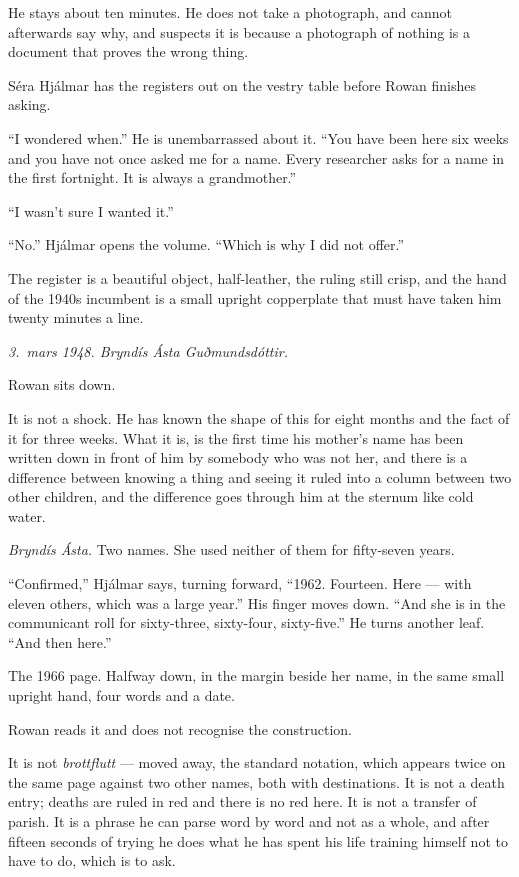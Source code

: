 \documentclass[11pt,oneside]{book}
\newcommand{\sceneline}{%
  \par\vspace{1.2em}
  \begin{center}
    \fontsize{11}{11}\selectfont \textbullet\quad\textbullet\quad\textbullet
  \end{center}
  \vspace{0.6em}\noindent\ignorespaces
}
\begin{document}
He stays about ten minutes. He does not take a photograph, and cannot
afterwards say why, and suspects it is because a photograph of nothing
is a document that proves the wrong thing.

\sceneline

Séra Hjálmar has the registers out on the vestry table before Rowan
finishes asking.

``I wondered when.'' He is unembarrassed about it. ``You have been here
six weeks and you have not once asked me for a name. Every researcher
asks for a name in the first fortnight. It is always a grandmother.''

``I wasn't sure I wanted it.''

``No.'' Hjálmar opens the volume. ``Which is why I did not offer.''

The register is a beautiful object, half-leather, the ruling still crisp,
and the hand of the 1940s incumbent is a small upright copperplate that
must have taken him twenty minutes a line.

\emph{3.~mars 1948. Bryndís Ásta Guðmundsdóttir.}

Rowan sits down.

It is not a shock. He has known the shape of this for eight months and
the fact of it for three weeks. What it is, is the first time his
mother's name has been written down in front of him by somebody who was
not her, and there is a difference between knowing a thing and seeing it
ruled into a column between two other children, and the difference goes
through him at the sternum like cold water.

\emph{Bryndís Ásta.} Two names. She used neither of them for fifty-seven
years.

``Confirmed,'' Hjálmar says, turning forward, ``1962. Fourteen. Here
--- with eleven others, which was a large year.'' His finger moves down.
``And she is in the communicant roll for sixty-three, sixty-four,
sixty-five.'' He turns another leaf. ``And then here.''

The 1966 page. Halfway down, in the margin beside her name, in the same
small upright hand, four words and a date.

Rowan reads it and does not recognise the construction.

It is not \emph{brottflutt} --- moved away, the standard notation, which
appears twice on the same page against two other names, both with
destinations. It is not a death entry; deaths are ruled in red and there
is no red here. It is not a transfer of parish. It is a phrase he can
parse word by word and not as a whole, and after fifteen seconds of
trying he does what he has spent his life training himself not to have
to do, which is to ask.
\end{document}

